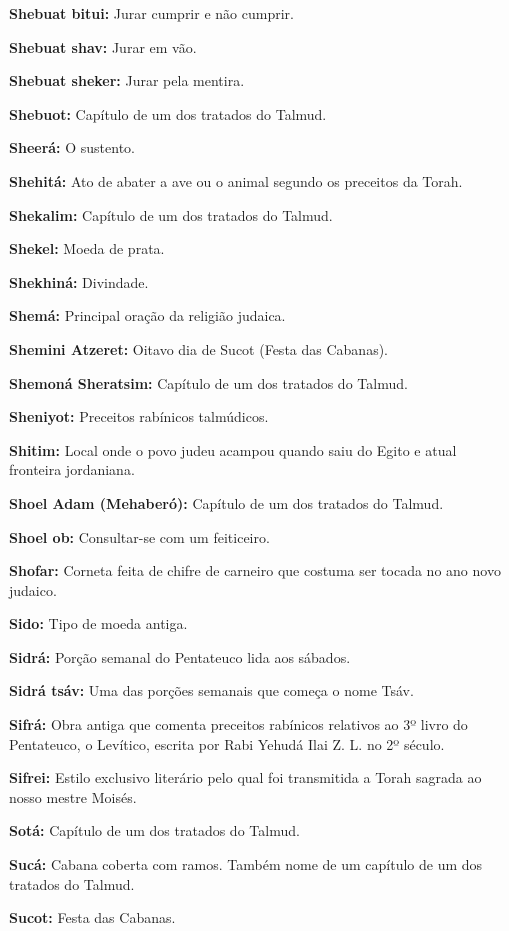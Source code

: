 \begin{hangparas}{.25in}{1}
{\textbf{Shebuat bitui:} Jurar cumprir e não cumprir.

\textbf{Shebuat shav:} Jurar em vão.

\textbf{Shebuat sheker:} Jurar pela mentira.

\textbf{Shebuot:} Capítulo de um dos tratados do Talmud.

\textbf{Sheerá:} O sustento.

\textbf{Shehitá:} Ato de abater a ave ou o animal segundo os preceitos
da Torah.

\textbf{Shekalim:} Capítulo de um dos tratados do Talmud.

\textbf{Shekel:} Moeda de prata.

\textbf{Shekhiná:} Divindade.

\textbf{Shemá:} Principal oração da religião judaica.

\textbf{Shemini Atzeret:} Oitavo dia de Sucot (Festa das Cabanas).

\textbf{Shemoná Sheratsim:} Capítulo de um dos tratados do Talmud.

\textbf{Sheniyot:} Preceitos rabínicos talmúdicos.

\textbf{Shitim:} Local onde o povo judeu acampou quando saiu do Egito e
atual fronteira jordaniana.

\textbf{Shoel Adam (Mehaberó):} Capítulo de um dos tratados do Talmud.

\textbf{Shoel ob:} Consultar-se com um feiticeiro.

\textbf{Shofar:} Corneta feita de chifre de carneiro que costuma ser
tocada no ano novo judaico.

\textbf{Sido:} Tipo de moeda antiga.

\textbf{Sidrá:} Porção semanal do Pentateuco lida aos sábados.

\textbf{Sidrá tsáv:} Uma das porções semanais que começa o nome Tsáv.

\textbf{Sifrá:} Obra antiga que comenta preceitos rabínicos relativos
ao 3º livro do Pentateuco, o Levítico, escrita por Rabi Yehudá Ilai Z.
L. no 2º século.

\textbf{Sifrei:} Estilo exclusivo literário pelo qual
foi transmitida a Torah sagrada ao nosso mestre Moisés.

\textbf{Sotá:} Capítulo de um dos tratados do Talmud.

\textbf{Sucá:} Cabana coberta com ramos. Também nome de um capítulo de
um dos tratados do Talmud.

\textbf{Sucot:} Festa das Cabanas.

}
\end{hangparas}
